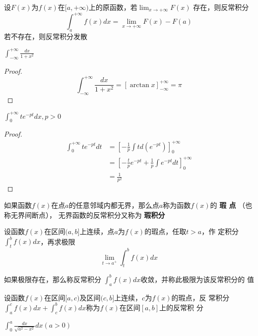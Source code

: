 \documentclass[11pt]{article}
\begin{document}
设\(F(x)\)为\(f(x)\)在\([a,+\infty)\)上的原函数，若\(\lim_{x\to+\infty}F(x)\)
存在，则反常积分
\begin{equation*}
\int_a^{+\infty}f(x)dx=\lim_{x\to+\infty}F(x)-F(a)
\end{equation*}
若不存在，则反常积分发散

\begin{proposition}[]
\(\int_{-\infty}^{+\infty}\frac{dx}{1+x^2}\)
\end{proposition}

\begin{proof}
\begin{equation*}
\int_{-\infty}^{+\infty}\frac{dx}{1+x^2}=[\arctan x]^{+\infty}_{-\infty}=\pi
\end{equation*}
\end{proof}

\begin{proposition}[]
\(\int_0^{+\infty}te^{-pt}dx,p>0\)
\end{proposition}

\begin{proof}
\begin{align*}
\int_0^{+\infty}te^{-pt}dt&=[-\frac{1}{p}\int td(e^{-pt})]^{+\infty}_0\\
&=[-\frac{t}{p}e^{-pt}+\frac{1}{p}\int e^{-pt}dt]^{+\infty}_0\\
&=\frac{1}{p^2}
\end{align*}
\end{proof}

如果函数\(f(x)\)在点\(a\)的任意邻域内都无界，那么点\(a\)称为函数\(f(x)\)的 \textbf{瑕
点}  （也称无界间断点）， 无界函数的反常积分又称为 \textbf{瑕积分}

设函数\(f(x)\)在区间\((a,b]\)上连续，点\(a\)为\(f(x)\)的瑕点，任取\(t>a\)，作
定积分\(\int_t^bf(x)dx\)，再求极限
\begin{equation*}
\lim_{t\to a^+}\int^b_tf(x)dx
\end{equation*}

\begin{definition}[]
如果极限存在，那么称反常积分 \(\int_a^bf(x)dx\)收敛，并称此极限为该反常积分的
值
\end{definition}

设函数\(f(x)\)在区间\([a,c)\)及区间\((c,b]\)上连续，\(c\)为\(f(x)\)的瑕点，反
常积分\(\int_a^cf(x)dx+\int_c^bf(x)dx\)称为\(f(x)\)在区间\([a,b]\)上的反常积
分

\begin{proposition}[]
\(\int_0^a\frac{dx}{\sqrt{a^2-x^2}}dx(a>0)\)
\end{proposition}
\end{document}
